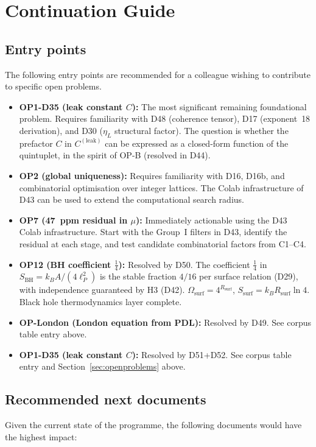 \documentclass[11pt,a4paper]{article}
\theoremstyle{plain}
\theoremstyle{definition}
\theoremstyle{remark}
\newcommand{\Rsurf}{R_{\mathrm{surf}}}
\newcommand{\SBH}{S_{\mathrm{BH}}}
\begin{document}
\section{Continuation Guide}
\label{sec:continuation}

\subsection{Entry points}
\label{subsec:entrypoints}
The following entry points are recommended for a colleague wishing to contribute to specific open problems.

\begin{itemize}
\item \textbf{OP1-D35 (leak constant $C$):} The most significant remaining foundational problem. Requires familiarity with D48 (coherence tensor), D17 (exponent~18 derivation), and D30 ($\eta_L$ structural factor). The question is whether the prefactor $C$ in $C^{(\mathrm{leak})}$ can be expressed as a closed-form function of the quintuplet, in the spirit of OP-B (resolved in D44).
\item \textbf{OP2 (global uniqueness):} Requires familiarity with D16, D16b, and combinatorial optimisation over integer lattices. The Colab infrastructure of D43 can be used to extend the computational search radius.
\item \textbf{OP7 (47~ppm residual in $\mu$):} Immediately actionable using the D43 Colab infrastructure. Start with the Group~I filters in D43, identify the residual at each stage, and test candidate combinatorial factors from C1--C4.
\item \textbf{OP12 (BH coefficient $\tfrac{1}{4}$):} \textcolor{proofblue}{Resolved by D50.} The coefficient $\tfrac{1}{4}$ in $\SBH = k_B A/(4\ell_P^2)$ is the stable fraction $4/16$ per surface relation (D29), with independence guaranteed by H3 (D42). $\Omega_{\mathrm{surf}} = 4^{\Rsurf}$, $S_{\mathrm{surf}} = k_B\Rsurf\ln 4$. Black hole thermodynamics layer complete.
\item \textbf{OP-London (London equation from PDL):} \textcolor{proofblue}{Resolved by D49.} See corpus table entry above.
\item \textbf{OP1-D35 (leak constant $C$):} \textcolor{proofblue}{Resolved by D51+D52.} See corpus table entry and Section~\ref{sec:openproblems} above.
\end{itemize}

\subsection{Recommended next documents}
\label{subsec:nextdocs}
Given the current state of the programme, the following documents would have the highest impact:
\end{document}
